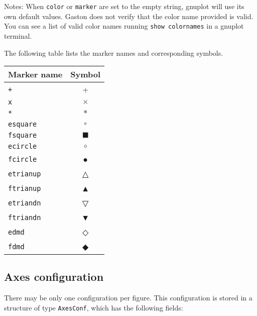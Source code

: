 \documentclass[11pt]{article}
\newcommand{\cmd}[1]{\texttt{#1}}
\begin{document}
Notes: When \cmd{color} or \cmd{marker} are set to the empty string, gnuplot will use
its own default values. Gaston does not verify that the color name provided is
valid. You can see a list of valid color names running \cmd{show colornames} in
a gnuplot terminal.

The following table lists the marker names and corresponding symbols.

{\small
\begin{center}
\begin{tabular}{lc}
	\toprule
	\textbf{Marker name} & \textbf{Symbol} \\
	\midrule
	\cmd{+} & + \\
	\cmd{x} & $\times$ \\
	\cmd{*} & $\ast$ \\
	\cmd{esquare} & $\square$ \\
	\cmd{fsquare} & $\blacksquare$ \\
	\cmd{ecircle} & $\circ$ \\
	\cmd{fcircle} & ● \\
	\cmd{etrianup} & △ \\
	\cmd{ftrianup} & ▲ \\
	\cmd{etriandn} & ▽ \\
	\cmd{ftriandn} & ▼ \\
	\cmd{edmd} & ◇ \\
	\cmd{fdmd} & ◆ \\
	\bottomrule
\end{tabular}
\end{center}}

\subsection{Axes configuration}

There may be only one configuration per figure. This configuration is stored in
a structure of type \cmd{AxesConf}, which has the following fields:
\end{document}
